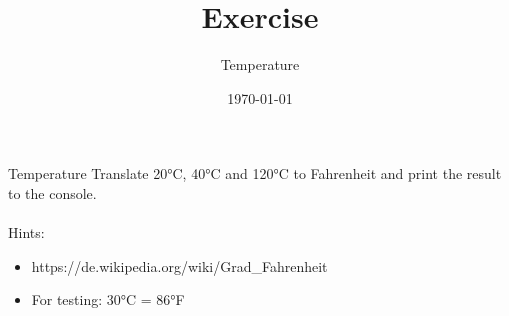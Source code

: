 


\title{Exercise}
\subtitle{Temperature}
\date{\today}




\begin{frame}
    \titlepage
\end{frame}

\begin{frame}{Temperature}
    Translate 20°C, 40°C and 120°C to Fahrenheit and print the result to the console.\\
    \\
    Hints:
    \begin{itemize}
        \item https://de.wikipedia.org/wiki/Grad_Fahrenheit
        \item For testing: 30°C = 86°F
    \end{itemize}
\end{frame}



